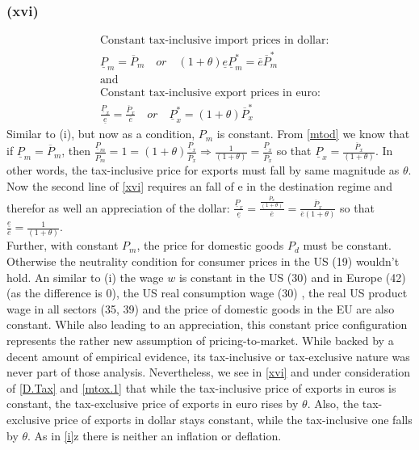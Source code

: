 \subsubsection*{(xvi)}
\begin{equation}\label{xvi}
\begin{aligned}
&\text{Constant tax-inclusive import prices in dollar:}\\ &\underline P_m = \overline P_m \quad or \quad (1+\theta)\underline e \underline P^*_m  = \overline e \overline P^*_m\\
&\text{and}\\
&\text{Constant tax-inclusive export prices in euro:}\\ &\frac{\underline P_x}{\underline e } = \frac{\overline P_x}{\overline e} \quad or \quad  \underline P^*_x = (1+\theta)\overline P^*_x 
\end{aligned}
\end{equation}
Similar to (i), but now as a condition, $P_m$ is constant. From \eqref{mtod} we know that if $\underline P_m = \overline P_m$, then $\frac{\underline P_m}{\overline P_m} = 1 = (1+\theta)\frac{\underline P_x}{\overline P_x} \Rightarrow \frac{1}{(1+\theta)} = \frac{\underline P_x}{\overline P_x}$ so that $\underline P_x = \frac{\overline P_x}{(1+\theta)}$. In other words, the tax-inclusive price for exports must fall by same magnitude as $\theta$. Now the second line of \eqref{xvi} requires an fall of e in the destination regime and therefor as well an appreciation of the dollar: $\frac{\underline P_x}{\underline e } = \frac{\frac{\overline P_x}{(1+\theta)}}{\overline e} = \frac{\overline P_x}{\overline e (1+\theta)}$ so that $\frac{\underline e}{\overline e} = \frac{1}{(1+\theta)}$.\\
Further, with constant $P_m$, the price for domestic goods $P_d$ must be constant. Otherwise the neutrality condition for consumer prices in the US (19) wouldn't hold. An similar to (i) the wage $w$ is constant in the US (30) and in Europe (42) (as the difference is 0), the US real consumption wage (30) , the real US product wage in all sectors (35, 39) and the price of domestic goods in the EU are also constant. While also leading to an appreciation, this constant price configuration represents the rather new assumption of pricing-to-market. While backed by a decent amount of empirical evidence, its tax-inclusive or tax-exclusive nature was never part of those analysis. Nevertheless, we see in \eqref{xvi} and under consideration of \eqref{D.Tax} and \eqref{mtox.1} that while the tax-inclusive price of exports in euros is constant, the tax-exclusive price of exports in euro rises by $\theta$. Also, the tax-exclusive price of exports in dollar stays constant, while the tax-inclusive one falls by $\theta$. As in \eqref{i}z there is neither an inflation or deflation. 

